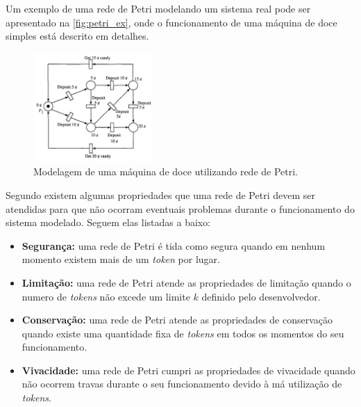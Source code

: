 Um exemplo de uma rede de Petri modelando um sistema real pode ser apresentado na \autoref{fig:petri_ex}, onde o funcionamento de uma máquina de doce simples está descrito em detalhes.

\begin{figure}[ht]
    \centering
    \includegraphics[width=0.4\textwidth, keepaspectratio]{resources/petriexemplo.png}
    \caption{Modelagem de uma máquina de doce utilizando rede de Petri. \cite{murata:1989}}
    \label{fig:petri_ex}
\end{figure}

Segundo  existem algumas propriedades que uma rede de Petri devem ser atendidas para que não ocorram eventuais problemas durante o funcionamento do sistema modelado. Seguem elas listadas a baixo:


\begin{itemize}
    \item \textbf{Segurança:} uma rede de Petri é tida como segura quando em nenhum momento existem mais de um \textit{token} por lugar. 
    \item \textbf{Limitação:} uma rede de Petri atende as propriedades de limitação quando o numero de \textit{tokens} não excede um limite $k$ definido pelo desenvolvedor.
    \item \textbf{Conservação:} uma rede de Petri atende as propriedades de conservação quando existe uma quantidade fixa de \textit{tokens} em todos os momentos do seu funcionamento.
    \item \textbf{Vivacidade:} uma rede de Petri cumpri as propriedades de vivacidade quando não ocorrem travas durante o seu funcionamento devido à má utilização de \textit{tokens}.
\end{itemize}








